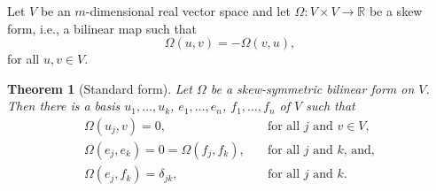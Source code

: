 \documentclass[prl,twocolumn,lengthcheck,superscriptaddress]{revtex4-1}
\newtheorem{theorem}{Theorem}
\theoremstyle{definition}
\theoremstyle{remark}
\begin{document}
Let $V$ be an $m$-dimensional real vector space and let $\Omega:V\times V \rightarrow \mathbb{R}$ be a skew form, i.e., a bilinear map such that
\begin{equation}
	\Omega(u, v) = -{\Omega(v,u)},
\end{equation}
for all $u, v\in V$.
\begin{theorem}[Standard form]
	Let $\Omega$ be a skew-symmetric bilinear form on $V$. Then there is a basis $u_1, \ldots, u_k$, $e_1, \ldots, e_n$, $f_1, \ldots, f_n$ of $V$ such that
	\begin{equation}
		\begin{split}
			\Omega(u_j, v) = 0, \quad &\text{for all $j$ and $v\in V$}, \\
			\Omega(e_j, e_k) = 0 = \Omega(f_j, f_k), \quad &\text{for all $j$ and $k$, and}, \\
			\Omega(e_j, f_k) = \delta_{jk},\quad &\text{for all $j$ and $k$.} \\
		\end{split}
	\end{equation}
\end{theorem}
\end{document}
